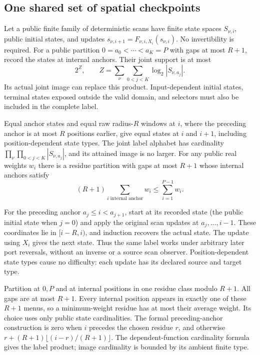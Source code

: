 \subsection{One shared set of spatial checkpoints}

Let a public finite family of deterministic scans have finite state spaces
$S_{\nu,i}$, public initial states, and updates
$s_{\nu,i+1}=F_{\nu,i,X_i}(s_{\nu,i})$. No invertibility is required.
For a public partition $0=a_0<\cdots<a_K=P$ with gaps at most $R+1$,
record the states at internal anchors. Their joint support is at most
\[
 2^Z,\qquad Z=\sum_\nu\sum_{0<j<K}\log_2|S_{\nu,a_j}|.
\]
Its actual joint image can replace this product. Input-dependent initial
states, terminal states exposed outside the valid domain, and selectors
must also be included in the complete label.

\begin{lemma}\label{lem:scan-checkpoints}
Equal anchor states and equal raw radius-$R$ windows at $i$, where the
preceding anchor is at most $R$ positions earlier, give equal states at
$i$ and $i+1$, including position-dependent state types. The joint label
alphabet has cardinality $\prod_\nu\prod_{0<j<K}|S_{\nu,a_j}|$, and its
attained image is no larger. For any public real weights $w_i$ there is a
residue partition with gaps at most $R+1$ whose internal anchors satisfy
\[
 (R+1)\sum_{i\text{ internal anchor}}w_i\le\sum_{i=1}^{P-1}w_i.
\]
\end{lemma}
\begin{outline}
For the preceding anchor $a_j\le i<a_{j+1}$, start at its recorded state
(the public initial state when $j=0$) and apply the original scan updates
at $a_j,\ldots,i-1$. These coordinates lie in $[i-R,i)$, and induction
recovers the actual state. The update using $X_i$ gives the next state.
Thus the same label works under arbitrary later port reversals, without
an inverse or a source scan observer. Position-dependent state types cause
no difficulty: each update has its declared source and target type.

Partition at $0,P$ and at internal positions in one residue class modulo
$R+1$. All gaps are at most $R+1$. Every internal position appears in
exactly one of these $R+1$ menus, so a minimum-weight residue has at most
their average weight. Its choice uses only public state cardinalities.
The formal preceding-anchor construction is zero when $i$ precedes the
chosen residue $r$, and otherwise $r+(R+1)\lfloor(i-r)/(R+1)\rfloor$.
The dependent-function cardinality formula gives the label product; image
cardinality is bounded by its ambient finite type.
\end{outline}

